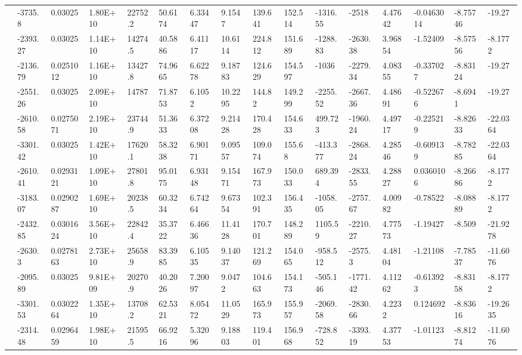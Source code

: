 \documentclass[paper=a4, fontsize=11pt]{scrartcl}
\numberwithin{equation}{section}
\numberwithin{figure}{section}
\numberwithin{table}{section}
\begin{document}
{{\begin{tabular}{l || l | l | l | l | l | l | l | l | l | l | l | l | l | l | l}
    & -3735.8 & 0.03025 & 1.80E+10 & 22752.2 & 50.6174 & 6.33447 & 9.1547 & 139.641 & 152.514 & -1316.55 & -2518 & 4.47642 & -0.0463014 & -8.75746 & -19.27 \\
    & -2393.27 & 0.03025 & 1.14E+10 & 14274.5 & 40.5886 & 6.41117 & 10.6114 & 224.812 & 151.689 & -1288.83 & -2630.38 & 3.96854 & -1.52409 & -8.57556 & -8.1772 \\
    & -2136.79 & 0.0251012 & 1.16E+10 & 13427.8 & 74.9665 & 6.62278 & 9.18783 & 124.629 & 154.597 & -1036 & -2279.34 & 4.08355 & -0.337027 & -8.83124 & -19.27 \\
    & -2551.26 & 0.03025 & 2.09E+10 & 14787 & 71.8753 & 6.1052 & 10.2295 & 144.82 & 149.299 & -2255.52 & -2667.36 & 4.48691 & -0.522676 & -8.6941 & -19.27 \\
    & -2610.58 & 0.0275071 & 2.19E+10 & 23744.9 & 51.3633 & 6.37208 & 9.21428 & 170.428 & 154.633 & 499.723 & -1960.24 & 4.49717 & -0.225219 & -8.82633 & -22.0364 \\
    & -3301.42 & 0.03025 & 1.42E+10 & 17620.1 & 58.3238 & 6.90171 & 9.09557 & 109.074 & 155.68 & -413.377 & -2868.24 & 4.28546 & -0.609139 & -8.78285 & -22.0364 \\
    & -2610.41 & 0.0293121 & 1.09E+10 & 27801.8 & 95.0175 & 6.93148 & 9.15471 & 167.973 & 150.033 & 689.394 & -2833.55 & 4.28827 & 0.0360106 & -8.26686 & -8.1772 \\
    & -3183.07 & 0.0290287 & 1.69E+10 & 20238.5 & 60.3234 & 6.74264 & 9.67354 & 102.391 & 156.435 & -1058.05 & -2757.67 & 4.00982 & -0.78522 & -8.08889 & -8.1772 \\
    & -2432.85 & 0.0301624 & 3.56E+10 & 22842.4 & 35.3722 & 6.46636 & 11.4128 & 170.701 & 148.289 & 1105.59 & -2210.27 & 4.77573 & -1.19427 & -8.509 & -21.9278 \\
    & -2630.3 & 0.0278163 & 2.73E+10 & 25658.9 & 83.3985 & 6.10535 & 9.14037 & 121.269 & 154.065 & -958.512 & -2575.3 & 4.48104 & -1.21108 & -7.78537 & -11.6076 \\
    & -2095.89 & 0.03025 & 9.81E+09 & 20270.9 & 40.2026 & 7.20097 & 9.0472 & 104.663 & 154.173 & -505.146 & -1771.42 & 4.11262 & -0.613923 & -8.83158 & -8.1772 \\
    & -3301.53 & 0.0302264 & 1.35E+10 & 13708.2 & 62.5321 & 8.05472 & 11.0529 & 165.973 & 155.957 & -2069.58 & -2830.66 & 4.2232 & 0.124692 & -8.83616 & -19.2635 \\
    & -2314.48 & 0.0296459 & 1.98E+10 & 21595.5 & 66.9216 & 5.32096 & 9.18803 & 119.401 & 156.968 & -728.852 & -3393.19 & 4.37753 & -1.01123 & -8.81274 & -11.6076 \\

\end{tabular}}}
\end{document}
